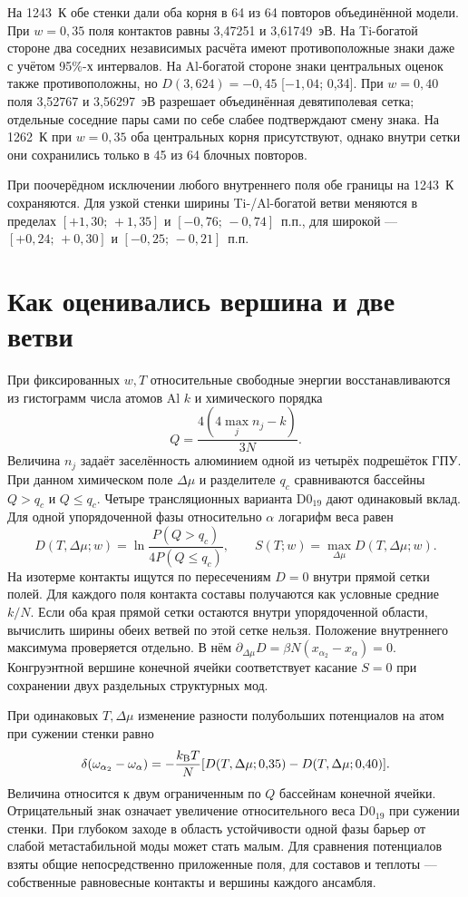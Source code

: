 \documentclass[11pt,a4paper]{article}
\begin{document}
На 1243~К обе стенки дали оба корня в 64 из 64 повторов объединённой модели. При \(w=0{,}35\) поля контактов равны 3,47251 и 3,61749~эВ. На Ti-богатой стороне два соседних независимых расчёта имеют противоположные знаки даже с учётом 95\%-х интервалов. На Al-богатой стороне знаки центральных оценок также противоположны, но \(D(3{,}624)=-0{,}45\) [\(-1{,}04\); 0,34]. При \(w=0{,}40\) поля 3,52767 и 3,56297~эВ разрешает объединённая девятиполевая сетка; отдельные соседние пары сами по себе слабее подтверждают смену знака. На 1262~К при \(w=0{,}35\) оба центральных корня присутствуют, однако внутри сетки они сохранились только в 45 из 64 блочных повторов.

При поочерёдном исключении любого внутреннего поля обе границы на 1243~К сохраняются. Для узкой стенки ширины Ti-/Al-богатой ветви меняются в пределах \([+1{,}30;\,+1{,}35]\) и \([-0{,}76;\,-0{,}74]\)~п.п., для широкой --- \([+0{,}24;\,+0{,}30]\) и \([-0{,}25;\,-0{,}21]\)~п.п.
\clearpage
\section*{Как оценивались вершина и две ветви}
При фиксированных \(w,T\) относительные свободные энергии восстанавливаются из гистограмм числа атомов Al \(k\) и химического порядка
\[
Q=\frac{4(4\max_j n_j-k)}{3N}.
\]
Величина \(n_j\) задаёт заселённость алюминием одной из четырёх подрешёток ГПУ. При данном химическом поле \(\Delta\mu\) и разделителе \(q_c\) сравниваются бассейны \(Q>q_c\) и \(Q\le q_c\). Четыре трансляционных варианта D0$_{19}$ дают одинаковый вклад. Для одной упорядоченной фазы относительно \(\alpha\) логарифм веса равен
\[
 D(T,\Delta\mu;w)=\ln\frac{P(Q>q_c)}{4P(Q\le q_c)},\qquad
 S(T;w)=\max_{\Delta\mu}D(T,\Delta\mu;w).
\]
На изотерме контакты ищутся по пересечениям \(D=0\) внутри прямой сетки полей. Для каждого поля контакта составы получаются как условные средние \(k/N\). Если оба края прямой сетки остаются внутри упорядоченной области, вычислить ширины обеих ветвей по этой сетке нельзя. Положение внутреннего максимума проверяется отдельно. В нём \(\partial_{\Delta\mu}D=\beta N(x_{\alpha_2}-x_\alpha)=0\). Конгруэнтной вершине конечной ячейки соответствует касание \(S=0\) при сохранении двух раздельных структурных мод.

При одинаковых \(T,\Delta\mu\) изменение разности полубольших потенциалов на атом при сужении стенки равно
\[
 \delta(\omega_{\alpha_2}-\omega_{\alpha})=
 -\frac{k_{\rm B}T}{N}[D(T,\Delta\mu;0{,}35)-D(T,\Delta\mu;0{,}40)].
\]
Величина относится к двум ограниченным по \(Q\) бассейнам конечной ячейки. Отрицательный знак означает увеличение относительного веса D0$_{19}$ при сужении стенки. При глубоком заходе в область устойчивости одной фазы барьер от слабой метастабильной моды может стать малым. Для сравнения потенциалов взяты общие непосредственно приложенные поля, для составов и теплоты --- собственные равновесные контакты и вершины каждого ансамбля.
\end{document}
